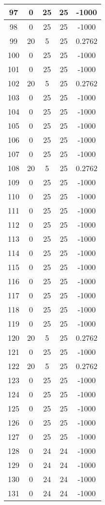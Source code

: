 \documentclass[letterpaper, 12pt]{article}
\begin{document}
\begin{longtable}{|c|c|c|c|c|}
\hline
97 & 0 & 25 & 25 & -1000 \\
\hline
98 & 0 & 25 & 25 & -1000 \\
\hline
99 & 20 & 5 & 25 & 0.2762 \\
\hline
100 & 0 & 25 & 25 & -1000 \\
\hline
101 & 0 & 25 & 25 & -1000 \\
\hline
102 & 20 & 5 & 25 & 0.2762 \\
\hline
103 & 0 & 25 & 25 & -1000 \\
\hline
104 & 0 & 25 & 25 & -1000 \\
\hline
105 & 0 & 25 & 25 & -1000 \\
\hline
106 & 0 & 25 & 25 & -1000 \\
\hline
107 & 0 & 25 & 25 & -1000 \\
\hline
108 & 20 & 5 & 25 & 0.2762 \\
\hline
109 & 0 & 25 & 25 & -1000 \\
\hline
110 & 0 & 25 & 25 & -1000 \\
\hline
111 & 0 & 25 & 25 & -1000 \\
\hline
112 & 0 & 25 & 25 & -1000 \\
\hline
113 & 0 & 25 & 25 & -1000 \\
\hline
114 & 0 & 25 & 25 & -1000 \\
\hline
115 & 0 & 25 & 25 & -1000 \\
\hline
116 & 0 & 25 & 25 & -1000 \\
\hline
117 & 0 & 25 & 25 & -1000 \\
\hline
118 & 0 & 25 & 25 & -1000 \\
\hline
119 & 0 & 25 & 25 & -1000 \\
\hline
120 & 20 & 5 & 25 & 0.2762 \\
\hline
121 & 0 & 25 & 25 & -1000 \\
\hline
122 & 20 & 5 & 25 & 0.2762 \\
\hline
123 & 0 & 25 & 25 & -1000 \\
\hline
124 & 0 & 25 & 25 & -1000 \\
\hline
125 & 0 & 25 & 25 & -1000 \\
\hline
126 & 0 & 25 & 25 & -1000 \\
\hline
127 & 0 & 25 & 25 & -1000 \\
\hline
128 & 0 & 24 & 24 & -1000 \\
\hline
129 & 0 & 24 & 24 & -1000 \\
\hline
130 & 0 & 24 & 24 & -1000 \\
\hline
131 & 0 & 24 & 24 & -1000 \\

\end{longtable}
\end{document}

